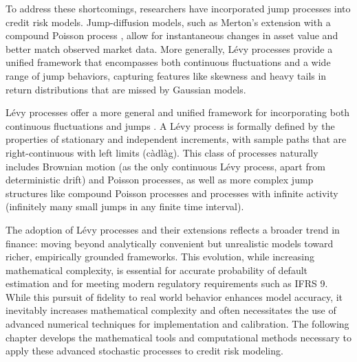\documentclass[11pt,twoside,openright]{report}
\begin{document}
To address these shortcomings, researchers have incorporated jump processes into credit risk models. Jump-diffusion models, such as Merton's extension with a compound Poisson process \cite{merton1976option}, allow for instantaneous changes in asset value and better match observed market data. More generally, Lévy processes provide a unified framework that encompasses both continuous fluctuations and a wide range of jump behaviors, capturing features like skewness and heavy tails in return distributions that are missed by Gaussian models.

Lévy processes offer a more general and unified framework for incorporating both continuous fluctuations and jumps \cite{applebaum2009levy, kyprianou2006introductory}. A Lévy process is formally defined by the properties of stationary and independent increments, with sample paths that are right-continuous with left limits (càdlàg). This class of processes naturally includes Brownian motion (as the only continuous Lévy process, apart from deterministic drift) and Poisson processes, as well as more complex jump structures like compound Poisson processes and processes with infinite activity (infinitely many small jumps in any finite time interval).

The adoption of Lévy processes and their extensions reflects a broader trend in finance: moving beyond analytically convenient but unrealistic models toward richer, empirically grounded frameworks. This evolution, while increasing mathematical complexity, is essential for accurate probability of default estimation and for meeting modern regulatory requirements such as IFRS 9. While this pursuit of fidelity to real world behavior enhances model accuracy, it inevitably increases mathematical complexity and often necessitates the use of advanced numerical techniques for implementation and calibration. The following chapter develops the mathematical tools and computational methods necessary to apply these advanced stochastic processes to credit risk modeling.


\end{document}
